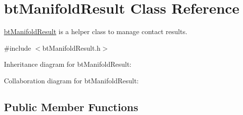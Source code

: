 \hypertarget{classbt_manifold_result}{\section{bt\+Manifold\+Result Class Reference}
\label{classbt_manifold_result}
}


\hyperlink{classbt_manifold_result}{bt\+Manifold\+Result} is a helper class to manage contact results.  




{\ttfamily \#include $<$bt\+Manifold\+Result.\+h$>$}



Inheritance diagram for bt\+Manifold\+Result\+:


Collaboration diagram for bt\+Manifold\+Result\+:
\subsection*{Public Member Functions}
